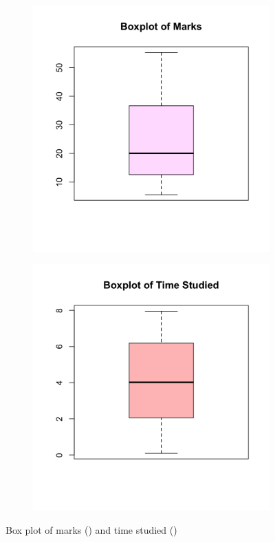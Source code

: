 \documentclass{article}
\begin{document}
\begin{figure}[h]
\centering
\begin{subfigure}{0.4\textwidth}
    \includegraphics[width=\textwidth]{imgs/Marks_Boxplot.png}
    \caption{}
    \label{fig:boxplotMarks}
    \end{subfigure}
    \hfill
    \begin{subfigure}{0.4\textwidth}
    \includegraphics[width=\textwidth]{imgs/Time_Study_Boxplot.png}  
    \caption{}
    \label{fig:boxplotTime}
    \end{subfigure}
    \caption{Box plot of marks () and time studied ()}
    \label{fig:boxplots}
\end{figure}
\end{document}
